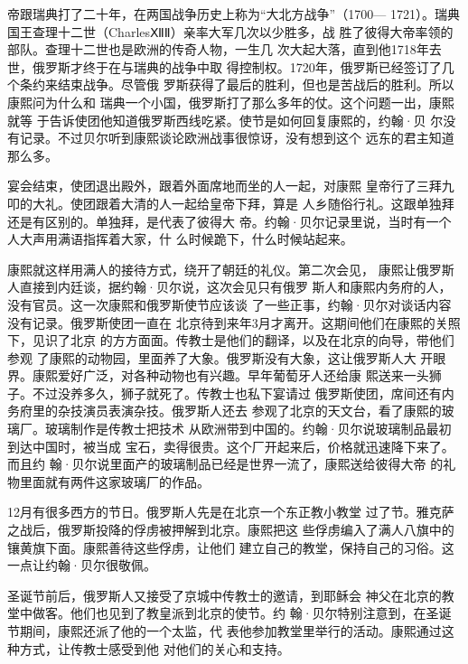 帝跟瑞典打了二十年，在两国战争历史上称为“大北方战争”（1700—%
1721）。瑞典国王查理十二世（CharlesⅫⅡ）亲率大军几次以少胜多，战%
胜了彼得大帝率领的部队。查理十二世也是欧洲的传奇人物，一生几%
次大起大落，直到他1718年去世，俄罗斯才终于在与瑞典的战争中取%
得控制权。1720年，俄罗斯已经签订了几个条约来结束战争。尽管俄%
罗斯获得了最后的胜利，但也是苦战后的胜利。所以康熙问为什么和%
瑞典一个小国，俄罗斯打了那么多年的仗。这个问题一出，康熙就等%
于告诉使团他知道俄罗斯西线吃紧。使节是如何回复康熙的，约翰·贝%
尔没有记录。不过贝尔听到康熙谈论欧洲战事很惊讶，没有想到这个%
远东的君主知道那么多。%
\par
宴会结束，使团退出殿外，跟着外面席地而坐的人一起，对康熙%
皇帝行了三拜九叩的大礼。使团跟着大清的人一起给皇帝下拜，算是%
人乡随俗行礼。这跟单独拜还是有区别的。单独拜，是代表了彼得大%
帝。约翰·贝尔记录里说，当时有一个人大声用满语指挥着大家，什%
么时候跪下，什么时候站起来。%
\par
康熙就这样用满人的接待方式，绕开了朝廷的礼仪。第二次会见，%
康熙让俄罗斯人直接到内廷谈，据约翰·贝尔说，这次会见只有俄罗%
斯人和康熙内务府的人，没有官员。这一次康熙和俄罗斯使节应该谈%
了一些正事，约翰·贝尔对谈话内容没有记录。俄罗斯使团一直在%
北京待到来年3月才离开。这期间他们在康熙的关照下，见识了北京%
的方方面面。传教士是他们的翻译，以及在北京的向导，带他们参观%
了康熙的动物园，里面养了大象。俄罗斯没有大象，这让俄罗斯人大%
开眼界。康熙爱好广泛，对各种动物也有兴趣。早年葡萄牙人还给康%
熙送来一头狮子。不过没养多久，狮子就死了。传教士也私下宴请过%
俄罗斯使团，席间还有内务府里的杂技演员表演杂技。俄罗斯人还去%
参观了北京的天文台，看了康熙的玻璃厂。玻璃制作是传教士把技术%
从欧洲带到中国的。约翰·贝尔说玻璃制品最初到达中国时，被当成%
宝石，卖得很贵。这个厂开起来后，价格就迅速降下来了。而且约%
翰·贝尔说里面产的玻璃制品已经是世界一流了，康熙送给彼得大帝%
的礼物里面就有两件这家玻璃厂的作品。%
\par
12月有很多西方的节日。俄罗斯人先是在北京一个东正教小教堂%
过了节。雅克萨之战后，俄罗斯投降的俘虏被押解到北京。康熙把这%
些俘虏编入了满人八旗中的镶黄旗下面。康熙善待这些俘虏，让他们%
建立自己的教堂，保持自己的习俗。这一点让约翰·贝尔很敬佩。%
\par
圣诞节前后，俄罗斯人又接受了京城中传教士的邀请，到耶稣会%
神父在北京的教堂中做客。他们也见到了教皇派到北京的使节。约%
翰·贝尔特别注意到，在圣诞节期间，康熙还派了他的一个太监，代%
表他参加教堂里举行的活动。康熙通过这种方式，让传教士感受到他%
对他们的关心和支持。%
